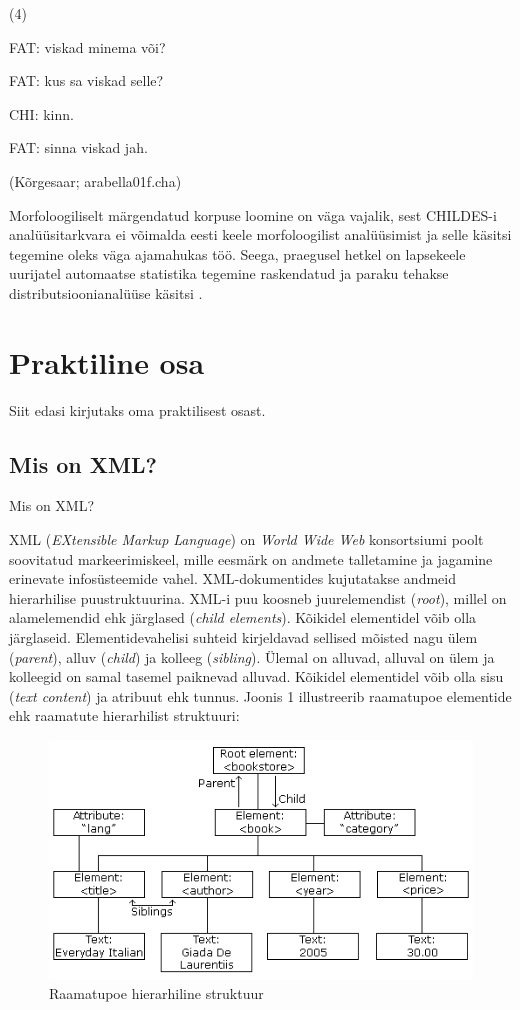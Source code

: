 \documentclass[12pt]{article}
\begin{document}
(4)
\begin{description}
    \item*FAT: viskad minema või?
    \item*FAT: kus sa viskad selle?
    \item*CHI: kinn.
    \item*FAT: sinna viskad jah.
    \item(Kõrgesaar; arabella01f.cha)
\end{description}
\hfill


Morfoloogiliselt märgendatud korpuse loomine on väga vajalik, sest CHILDES-i analüüsitarkvara ei võimalda eesti keele morfoloogilist analüüsimist ja selle käsitsi tegemine oleks väga ajamahukas töö. Seega, praegusel hetkel on lapsekeele uurijatel automaatse statistika tegemine raskendatud ja paraku tehakse distributsioonianalüüse käsitsi \citep[78]{Argus2007}.

\newpage

\section{Praktiline osa}
Siit edasi kirjutaks oma praktilisest osast.

\subsection{Mis on XML?}

Mis on XML?

XML (\emph{EXtensible Markup Language}) on \emph{World Wide Web} konsortsiumi poolt soovitatud markeerimiskeel, mille eesmärk on andmete talletamine ja jagamine erinevate infosüsteemide vahel. XML-dokumentides kujutatakse andmeid hierarhilise puustruktuurina. XML-i puu koosneb juurelemendist (\emph{root}), millel on alamelemendid ehk järglased (\emph{child elements}). Kõikidel elementidel võib olla järglaseid. Elementidevahelisi suhteid kirjeldavad sellised mõisted nagu ülem (\emph{parent}), alluv (\emph{child}) ja kolleeg (\emph{sibling}). Ülemal on alluvad, alluval on ülem ja kolleegid on samal tasemel paiknevad alluvad. Kõikidel elementidel võib olla sisu (\emph{text content}) ja atribuut ehk tunnus. \citep{XML} Joonis 1 illustreerib raamatupoe elementide ehk raamatute hierarhilist struktuuri:

\begin{figure}[h]
\centering
\includegraphics[width=\textwidth]{figures/nodetree}
\caption{Raamatupoe hierarhiline struktuur \citep{XML}}
\end{figure}
\end{document}
